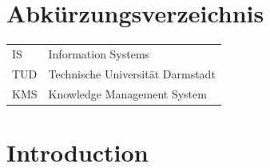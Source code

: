\documentclass[
	english,
	ruledheaders=section,%
	class=report,%
	thesis={type=bachelor},%
	accentcolor=1b,%
	custommargins=true,%
	marginpar=false,%
	parskip=half-,%
	fontsize=11pt,%
	DIV=14,
]{tudapub}
\begin{document}
\listoffigures
{}           %

\listoftables
{}           %

\chapter*{Abkürzungsverzeichnis}

\begin{xtabular}{ll}
IS					&	Information Systems\\
TUD					&	Technische Universität Darmstadt\\
KMS                 &   Knowledge Management System \\

\end{xtabular} 


\onehalfspacing
\chapter{Introduction}
\setcounter{seitenzahlroemisch}{\value{page}}
\end{document}
